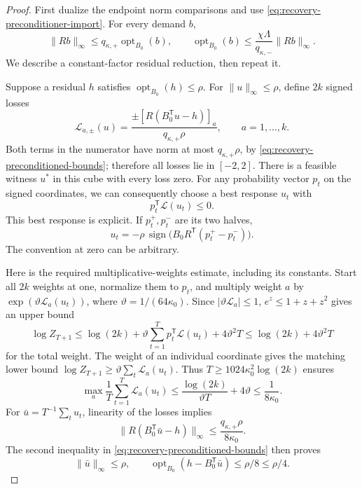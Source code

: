 \documentclass[11pt]{article}
\theoremstyle{definition}\newtheorem{definition}[theorem]{Definition}
\theoremstyle{remark}\newtheorem{remark}[theorem]{Remark}
\begin{document}
\begin{proof}
First dualize the endpoint norm comparisons and use
\eqref{eq:recovery-preconditioner-import}. For every demand $b$,
\begin{equation}\label{eq:recovery-preconditioned-bounds}
 \|Rb\|_\infty\le q_{\kappa,+}\operatorname{opt}_{B_0}(b),
 \qquad
 \operatorname{opt}_{B_0}(b)\le
      \frac{\chi\Lambda}{q_{\kappa,-}}\|Rb\|_\infty.
\end{equation}
We describe a constant-factor residual reduction, then repeat it.

Suppose a residual $h$ satisfies $\operatorname{opt}_{B_0}(h)\le\rho$.
For $\|u\|_\infty\le\rho$, define $2k$ signed losses
\[
 \mathcal L_{a,\pm}(u)=
 \frac{\pm[R(B_0^{\mathsf T}u-h)]_a}{q_{\kappa,+}\rho},
 \qquad a=1,\ldots,k.
\]
Both terms in the numerator have norm at most $q_{\kappa,+}\rho$,
by \eqref{eq:recovery-preconditioned-bounds}; therefore all losses lie
in $[-2,2]$. There is a feasible witness $u^*$ in this cube with every
loss zero. For any probability vector $p_t$ on the signed coordinates,
we can consequently choose a best response $u_t$ with
\[
 p_t^{\mathsf T}\mathcal L(u_t)\le0.
\]
This best response is explicit. If $p_t^+,p_t^-$ are its two halves,
\[
 u_t=-\rho\,\operatorname{sign}
       \bigl(B_0R^{\mathsf T}(p_t^+-p_t^-)\bigr).
\]
The convention at zero can be arbitrary.

Here is the required multiplicative-weights estimate, including its
constants. Start all $2k$ weights at one, normalize them to $p_t$, and
multiply weight $a$ by
$\exp(\vartheta\mathcal L_a(u_t))$, where
$\vartheta=1/(64\kappa_0)$. Since $|\vartheta\mathcal L_a|\le1$,
$e^z\le1+z+z^2$ gives an upper bound
\[
 \log Z_{T+1}\le\log(2k)
       +\vartheta\sum_{t=1}^T p_t^{\mathsf T}\mathcal L(u_t)
       +4\vartheta^2T
 \le\log(2k)+4\vartheta^2T
\]
for the total weight. The weight of an individual coordinate gives the
matching lower bound
$\log Z_{T+1}\ge\vartheta\sum_t\mathcal L_a(u_t)$.
Thus $T\ge1024\kappa_0^2\log(2k)$ ensures
\[
 \max_a\frac1T\sum_{t=1}^T\mathcal L_a(u_t)
 \le\frac{\log(2k)}{\vartheta T}+4\vartheta
 \le\frac1{8\kappa_0}.
\]
For $\bar u=T^{-1}\sum_tu_t$, linearity of the losses implies
\[
 \|R(B_0^{\mathsf T}\bar u-h)\|_\infty
       \le\frac{q_{\kappa,+}\rho}{8\kappa_0}.
\]
The second inequality in \eqref{eq:recovery-preconditioned-bounds}
then proves
\[
 \|\bar u\|_\infty\le\rho,\qquad
 \operatorname{opt}_{B_0}(h-B_0^{\mathsf T}\bar u)\le\rho/8\le\rho/4.
\]


\end{proof}
\end{document}
